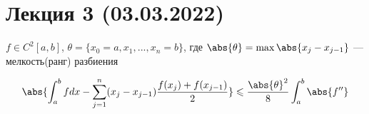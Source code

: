 \section*{Лекция 3 (03.03.2022)}

\begin{theorem}

\quad

$f \in C^2[a, b]$, $\theta = \{ x_0 = a, x_1, ... , x_n = b\}$, 
где $\abs{\theta} = \max{\abs{x_j - x_{j - 1}}}$ --- мелкость(ранг) разбиения

\[
\abs{\int_a^b {f} dx - \sum_{j = 1} ^ n (x_j - x_{j - 1}) \frac{f(x_j) + f(x_{j - 1})}{2}} \leqslant \frac{\abs{\theta} ^ 2}{8} \int_a^b \abs{f''}\]

\end{theorem}

